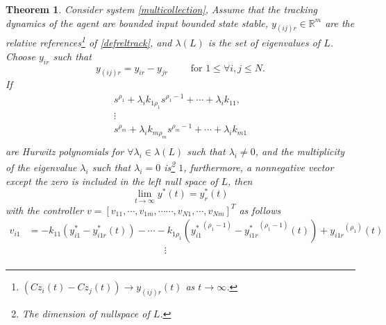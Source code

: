 \documentclass[11pt, a4paper, oneside, openany, reqno]{book}
\newtheorem{theorem}{Theorem}[chapter]
\theoremstyle{definition}
\theoremstyle{remark}
\numberwithin{equation}{chapter} %
\newcommand{\R}{\ensuremath{{\mathbb R}}}
\begin{document}
\begin{theorem}\label{multireltracking}
	Consider system \eqref{multicollection}, 
	Assume that the tracking dynamics of the agent are bounded input bounded state stable,
	$ y_{(ij)r} \in \R^m $ are the relative references\footnote
	{$( Cz_i(t) - Cz_j(t)) \to y_{(ij)r}(t) $ as $ t \to \infty $.}
	of \eqref{defreltrack},
	and $ \lambda(L) $ is the set of eigenvalues of $ L $.	\\	
	Choose $ y_{ir} $ such that
	\begin{equation}
	y_{(ij)r} = y_{ir} - y_{jr}
	\qquad \text{ for }  1 \leq \forall i,j \leq N.
	\end{equation}	If 
	\begin{equation}\label{multihurwitz}
	\begin{array}{c} 
	s^{\rho_1} + \lambda_i k_{1\rho_1} s^{\rho_1-1} + \cdots + \lambda_i k_{11}, \\
	\vdots \\
	s^{\rho_m} + \lambda_i k_{m\rho_m} s^{\rho_m-1} + \cdots + \lambda_i k_{m1} \\
	\end{array}
	\end{equation} 
	are Hurwitz polynomials for 
	$ \forall \lambda_i \in \lambda(L) $ such that $ \lambda_i \neq 0 $,	
	and the multiplicity of the eigenvalue $ \lambda_i $ such that $ \lambda_i = 0$
	is\footnote{The dimension of nullspace of $ L $.} $ 1 $, 	
	furthermore, 
	a nonnegative vector except the zero is included in the left null space of $ L $,
	then
	\begin{equation}\label{trackingstmt}
	\lim_{t \to \infty} y^* (t) = y_{r}^* (t) 
	\end{equation}
	with the controller 
	$ v=\left[ v_{11},\cdots,v_{1m}, \cdots\cdots,v_{N1},\cdots,v_{Nm} \right]^T $ as follows
	\begin{equation}\begin{split}\label{decontrol}
	v_{i1}& = -k_{11}(y_{i1}^* - y_{i1r}^* (t) ) - \cdots 
	- k_{1\rho_1} ({y_{i1}^*}^{(\rho_1 -1)} - {y_{i1r}^*}^{(\rho_1 -1)} (t) ) + {y_{i1r}}^{(\rho_1)} (t) \\
	&\qquad\qquad\qquad\qquad\qquad\qquad\qquad \vdots \\

\end{split}
\end{equation}
\end{theorem}
\end{document}
